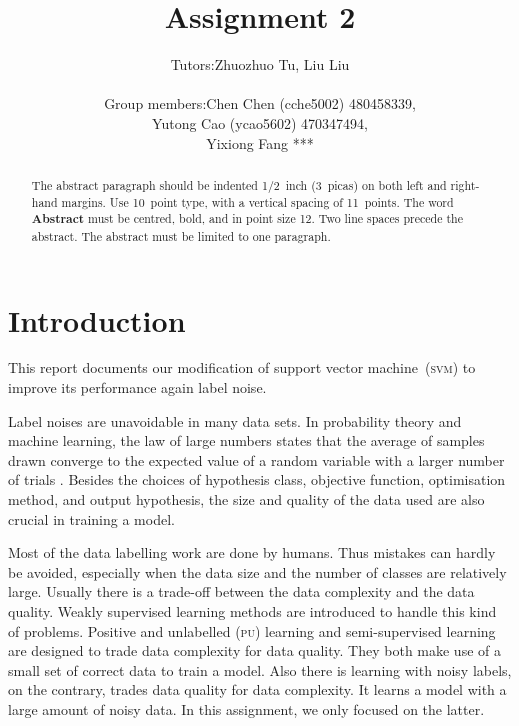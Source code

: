 \documentclass{article} %
\title{Assignment 2}
\newcommand{\svm}{\textsc{svm}}
\begin{document}
\author{%
 \begin{tabular}{rl}
  Tutors: & Zhuozhuo Tu, Liu Liu\\ \\
Group members: & Chen Chen (cche5002) 480458339, \\
& Yutong Cao (ycao5602) 470347494,\\
& Yixiong Fang ***
\end{tabular}
}

\maketitle



\begin{abstract}
The abstract paragraph should be indented 1/2~inch (3~picas) on both left and
right-hand margins. Use 10~point type, with a vertical spacing of 11~points.
The word \textbf{Abstract} must be centred, bold, and in point size 12. Two
line spaces precede the abstract. The abstract must be limited to one
paragraph.
\end{abstract}
\section{Introduction}
This report documents our modification of support vector machine~(\svm) to improve its performance again label noise.

Label noises are unavoidable in many data sets. In probability theory and machine learning, the law of large numbers states that the average of samples drawn converge to the expected value of a random variable with a larger number of trials \citep{hardle2007applied}. Besides the choices of hypothesis class, objective function, optimisation method, and output hypothesis, the size and quality of the data used are also crucial in training a model. 

Most of the data labelling work are done by humans. Thus mistakes can hardly be avoided, especially when the data size and the number of classes are relatively large. Usually there is a trade-off between the data complexity and the data quality. Weakly supervised learning methods are introduced to handle this kind of problems. Positive and unlabelled (\textsc{pu}) learning and semi-supervised learning are designed to trade data complexity for data quality. They both make use of a small set of correct data to train a model. Also there is learning with noisy labels, on the contrary, trades data quality for data complexity. It learns a model with a large amount of noisy data. In this assignment, we only focused on the latter.
\end{document}
